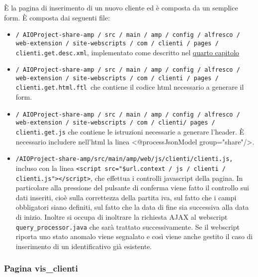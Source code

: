 È la pagina di inserimento di un nuovo cliente ed è composta da un semplice form.
È composta dai seguenti file:
\begin{itemize}
\item \texttt{/ AIOProject-share-amp / src / main / amp / config / alfresco / web-extension / site-webscripts / com / clienti / pages / clienti.get.desc.xml}, implementato come descritto nel \hyperref[cap:architettura]{ quarto  capitolo}
\item\texttt{/ AIOProject-share-amp / src / main / amp / config / alfresco / web-extension / site-webscripts / com / clienti / pages / clienti.get.html.ftl }che contiene il codice html necessario a generare il form.
\item\texttt{/ AIOProject-share-amp / src / main / amp / config / alfresco / web-extension / site-webscripts / com / clienti/ pages / clienti.get.js} che contiene le istruzioni necessarie a generare l’header. È necessario includere nell’html la linea <@processJsonModel group="share"/>.
\item \texttt{/AIOProject-share-amp/src/main/amp/web/js/clienti/clienti.js,} incluso con la linea \texttt{<script src="\${url.context} / js / clienti / clienti.js"></script>}, che effettua i controlli javascript della pagina. In particolare alla pressione del pulsante di conferma viene fatto il controllo sui dati inseriti, cioè sulla correttezza della partita iva, sul fatto che i campi obbligatori siano definiti, sul fatto che la data di fine sia successiva alla data di inizio. Inoltre si occupa di inoltrare la richiesta AJAX al webscript \texttt{query\_processor.java} che sarà trattato successivamente. Se il webscript riporta uno stato anomalo viene segnalato e così viene anche gestito il caso di inserimento di un identificativo già esistente.
\end{itemize}

\subsubsection{Pagina vis\_clienti}

